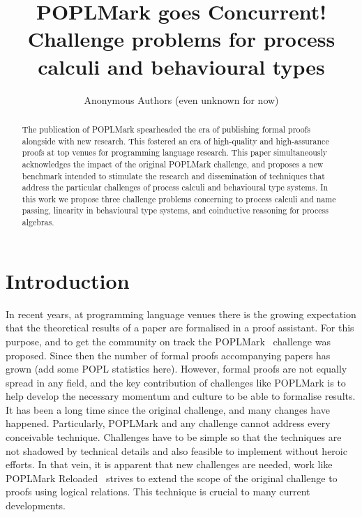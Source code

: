 \documentclass{jfp}
\begin{document}


\totalpg{\pageref{lastpage01}}

\title{POPLMark goes Concurrent!\\Challenge problems for process calculi and behavioural types}

\begin{authgrp}
\author{Anonymous Authors (even unknown for now)}
\end{authgrp}

\begin{abstract}
  The publication of POPLMark spearheaded the era of publishing formal
  proofs alongside with new research. This fostered an era of
  high-quality and high-assurance proofs at top venues for programming
  language research. This paper simultaneously acknowledges the impact
  of the original POPLMark challenge, and proposes a new benchmark
  intended to stimulate the research and dissemination of techniques
  that address the particular challenges of process calculi and
  behavioural type systems. In this work we propose three challenge
  problems concerning to process calculi and name passing, linearity
  in behavioural type systems, and coinductive reasoning for process
  algebras.
\end{abstract}

\maketitle[F]

\section{Introduction}

In recent years, at programming language venues there is the growing
expectation that the theoretical results of a paper are formalised in
a proof assistant. %
For this purpose, and to get the community on track the
POPLMark~\cite{Pierce:2005} challenge was proposed. Since then the
number of formal proofs accompanying papers has grown (add some POPL
statistics here). However, formal proofs are not equally spread in any
field, and the key contribution of challenges like POPLMark is to help
develop the necessary momentum and culture to be able to formalise
results. It has been a long time since the original challenge, and
many changes have happened. Particularly, POPLMark and any challenge
cannot address every conceivable technique. Challenges have to be
simple so that the techniques are not shadowed by technical details
and also feasible to implement without heroic efforts. In that vein,
it is apparent that new challenges are needed, work like POPLMark
Reloaded~\cite{Pientka:2019} strives to extend the scope of the
original challenge to proofs using logical relations. This technique
is crucial to many current developments.
\end{document}
